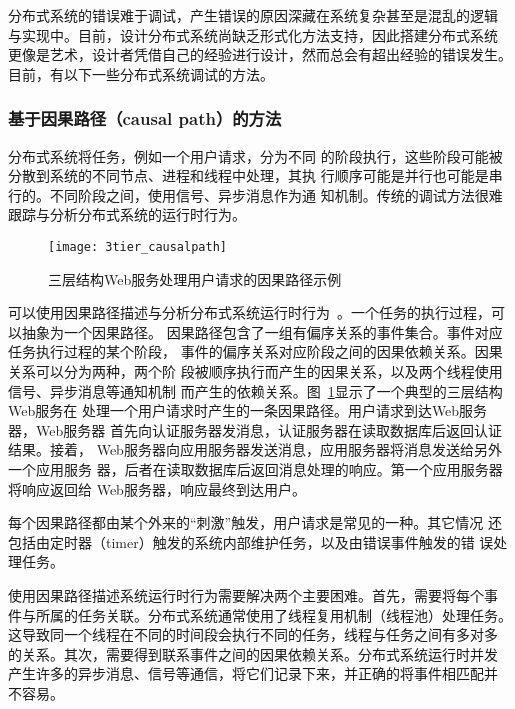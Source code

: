 分布式系统的错误难于调试，产生错误的原因深藏在系统复杂甚至是混乱的逻辑
与实现中。目前，设计分布式系统尚缺乏形式化方法支持，因此搭建分布式系统
更像是艺术，设计者凭借自己的经验进行设计，然而总会有超出经验的错误发生。
目前，有以下一些分布式系统调试的方法。

\subsubsection*{基于因果路径（causal path）的方法}



分布式系统将任务，例如一个用户请求，分为不同
的阶段执行，这些阶段可能被分散到系统的不同节点、进程和线程中处理，其执
行顺序可能是并行也可能是串行的。不同阶段之间，使用信号、异步消息作为通
知机制。传统的调试方法很难跟踪与分析分布式系统的运行时行为。

\begin{figure}[htbp]
\centering
\texttt{[image: 3tier\_causalpath]}
\caption{三层结构Web服务处理用户请求的因果路径示例}
\label{fig:3tier}
\end{figure}

可以使用因果路径描述与分析分布式系统运行时行为~\cite{pinpoint, magpie,
pip, x-trace, project5}。一个任务的执行过程，可以抽象为一个因果路径。
因果路径包含了一组有偏序关系的事件集合。事件对应任务执行过程的某个阶段，
事件的偏序关系对应阶段之间的因果依赖关系。因果关系可以分为两种，两个阶
段被顺序执行而产生的因果关系，以及两个线程使用信号、异步消息等通知机制
而产生的依赖关系。图~\ref{fig:3tier}显示了一个典型的三层结构Web服务在
处理一个用户请求时产生的一条因果路径。用户请求到达Web服务器，Web服务器
首先向认证服务器发消息，认证服务器在读取数据库后返回认证结果。接着，
Web服务器向应用服务器发送消息，应用服务器将消息发送给另外一个应用服务
器，后者在读取数据库后返回消息处理的响应。第一个应用服务器将响应返回给
Web服务器，响应最终到达用户。

每个因果路径都由某个外来的“刺激”触发，用户请求是常见的一种。其它情况
还包括由定时器（timer）触发的系统内部维护任务，以及由错误事件触发的错
误处理任务。

使用因果路径描述系统运行时行为需要解决两个主要困难。首先，需要将每个事
件与所属的任务关联。分布式系统通常使用了线程复用机制（线程池）处理任务。
这导致同一个线程在不同的时间段会执行不同的任务，线程与任务之间有多对多
的关系。其次，需要得到联系事件之间的因果依赖关系。分布式系统运行时并发
产生许多的异步消息、信号等通信，将它们记录下来，并正确的将事件相匹配并
不容易。

